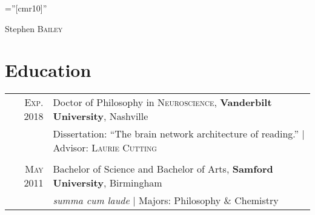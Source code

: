 \documentclass[a4paper,10pt]{article}
\begin{document}
\pagestyle{empty} %

\font\fb=''[cmr10]'' %

\par{\centering
		{\Huge Stephen \textsc{Bailey}
	}\\ \medskip}


\section{Education}
\begin{tabular}{rl}	

    \textsc{Exp.} 2018 & Doctor of Philosophy in \textsc{Neuroscience}, \textbf{Vanderbilt University}, Nashville\\
    & Dissertation: ``The brain network architecture of reading.'' | \small Advisor: \textsc{Laurie Cutting}\\ \\
    
    \textsc{May} 2011 & Bachelor of Science and Bachelor of Arts, \textbf{Samford University}, Birmingham\\
    & \small\emph{summa cum laude} | Majors: Philosophy \& Chemistry\\

\end{tabular}


\end{document}
